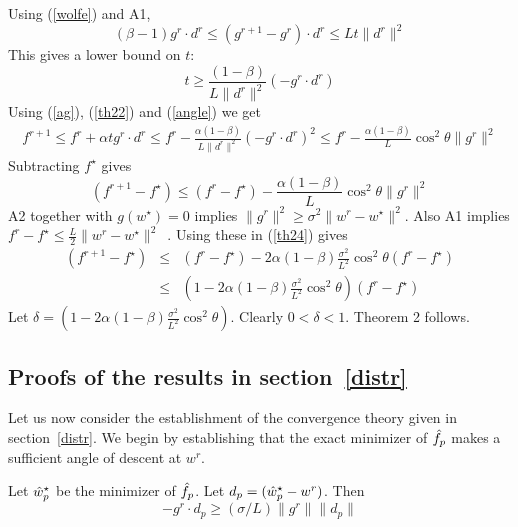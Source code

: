 \documentclass[twoside, 11pt]{article}
\begin{document}
 Using (\ref{wolfe}) and A1,
\begin{equation}
(\beta-1)g^r\cdot d^r \le (g^{r+1}-g^r)\cdot d^r \le Lt\|d^r\|^2
\label{th21}
\end{equation}
This gives a lower bound on $t$:
\begin{equation}
t \ge \frac{(1-\beta)}{L\|d^r\|^2} (-g^r\cdot d^r)
\label{th22}
\end{equation}
Using (\ref{ag}), (\ref{th22}) and (\ref{angle}) we get
\begin{eqnarray}
f^{r+1} \le  f^r + \alpha t g^r\cdot d^r
        \le  f^r - \frac{\alpha(1-\beta)}{L\|d^r\|^2} (-g^r\cdot d^r)^2
        \le  f^r - \frac{\alpha(1-\beta)}{L} \cos^2 \theta \|g^r\|^2
\label{th23}
\end{eqnarray}
Subtracting $f^\star$ gives
\begin{equation}
(f^{r+1} - f^\star) \le  (f^r-f^\star) - \frac{\alpha(1-\beta)}{L} \cos^2 \theta \|g^r\|^2
\label{th24}
\end{equation}
A2 together with $g(w^\star)=0$ implies $\|g^r\|^2\ge\sigma^2\|w^r-w^\star\|^2$. Also A1 implies $f^r-f^\star \le \frac{L}{2}\|w^r-w^\star\|^2$~\cite{smola2008}. Using these in (\ref{th24}) gives
\begin{eqnarray}
(f^{r+1}-f^\star) & \le & (f^r - f^\star) - 2\alpha(1-\beta)\frac{\sigma^2}{L^2} \cos^2\theta (f^r - f^\star) \nonumber \\
                  & \le & (1 - 2\alpha(1-\beta)\frac{\sigma^2}{L^2} \cos^2\theta) (f^r - f^\star)
\label{th25}
\end{eqnarray}
Let $\delta = (1 - 2\alpha(1-\beta)\frac{\sigma^2}{L^2} \cos^2\theta)$. Clearly $0 < \delta < 1$. Theorem 2 follows.

\subsection*{Proofs of the results in section~\ref{distr}}

Let us now consider the establishment of the convergence theory given in section~\ref{distr}. We begin by establishing that the exact minimizer of $\hat{f}_p$ makes a sufficient angle of descent at $w^r$.

\vspace*{0.1in}

 Let $\hat{w}_p^\star$ be the minimizer of $\hat{f}_p$. Let $d_p= (\hat{w}_p^\star-w^r)$. Then
\begin{equation}
-g^r\cdot d_p \ge (\sigma/L) \|g^r\| \|d_p\|
\label{suffangle}
\end{equation}
\end{document}
